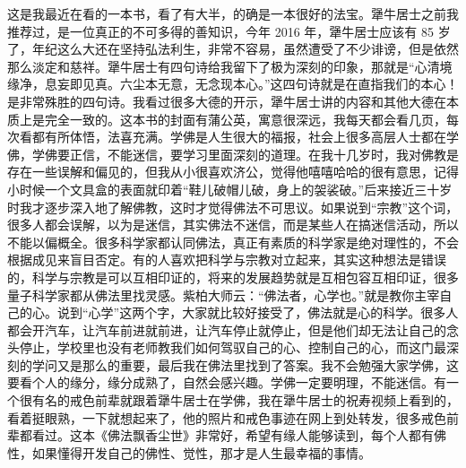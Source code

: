 \begin{book}
    这是我最近在看的一本书，看了有大半，的确是一本很好的法宝。犟牛居士之前我推荐过，是一位真正的不可多得的善知识，今年 2016 年，犟牛居士应该有 85 岁了，年纪这么大还在坚持弘法利生，非常不容易，虽然遭受了不少诽谤，但是依然那么淡定和慈祥。犟牛居士有四句诗给我留下了极为深刻的印象，那就是“心清境缘净，息妄即见真。六尘本无意，无念现本心。”这四句诗就是在直指我们的本心！是非常殊胜的四句诗。我看过很多大德的开示，犟牛居士讲的内容和其他大德在本质上是完全一致的。这本书的封面有蒲公英，寓意很深远，我每天都会看几页，每次看都有所体悟，法喜充满。学佛是人生很大的福报，社会上很多高层人士都在学佛，学佛要正信，不能迷信，要学习里面深刻的道理。在我十几岁时，我对佛教是存在一些误解和偏见的，但我从小很喜欢济公，觉得他嘻嘻哈哈的很有意思，记得小时候一个文具盒的表面就印着“鞋儿破帽儿破，身上的袈裟破。”后来接近三十岁时我才逐步深入地了解佛教，这时才觉得佛法不可思议。如果说到“宗教”这个词，很多人都会误解，以为是迷信，其实佛法不迷信，而是某些人在搞迷信活动，所以不能以偏概全。很多科学家都认同佛法，真正有素质的科学家是绝对理性的，不会根据成见来盲目否定。有的人喜欢把科学与宗教对立起来，其实这种想法是错误的，科学与宗教是可以互相印证的，将来的发展趋势就是互相包容互相印证，很多量子科学家都从佛法里找灵感。紫柏大师云：“佛法者，心学也。”就是教你主宰自己的心。说到“心学”这两个字，大家就比较好接受了，佛法就是心的科学。很多人都会开汽车，让汽车前进就前进，让汽车停止就停止，但是他们却无法让自己的念头停止，学校里也没有老师教我们如何驾驭自己的心、控制自己的心，而这门最深刻的学问又是那么的重要，最后我在佛法里找到了答案。我不会勉强大家学佛，这要看个人的缘分，缘分成熟了，自然会感兴趣。学佛一定要明理，不能迷信。有一个很有名的戒色前辈就跟着犟牛居士在学佛，我在犟牛居士的祝寿视频上看到的，看着挺眼熟，一下就想起来了，他的照片和戒色事迹在网上到处转发，很多戒色前辈都看过。这本《佛法飘香尘世》非常好，希望有缘人能够读到，每个人都有佛性，如果懂得开发自己的佛性、觉性，那才是人生最幸福的事情。
\end{book}
